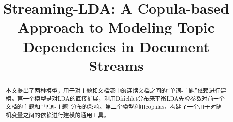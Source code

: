 \documentclass{article}
\begin{document}
\title{Streaming-LDA: A Copula-based Approach to Modeling Topic Dependencies in Document Streams}
\date{}
\maketitle

\begin{abstract}
本文提出了两种模型，用于对主题和文档流中的连续文档之间的“单词-主题”依赖进行建模。第一个模型是对LDA的直接扩展，利用Dirichlet分布来平衡LDA先验参数对前一个文档的主题和“单词-主题”分布的影响。第二个模型利用copulas，构建了一个用于对随机变量之间的依赖进行建模的通用工具。
\end{abstract}
\end{document}
